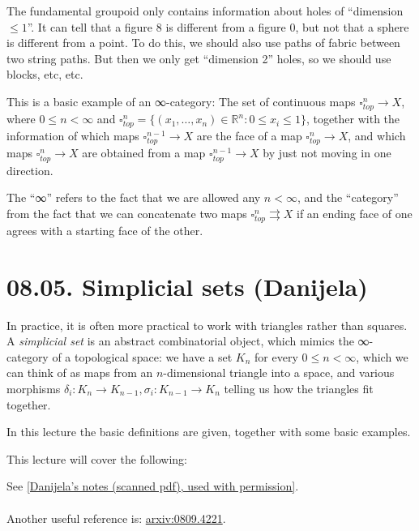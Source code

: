 \documentclass[a4paper]{amsart}
\numberwithin{figure}{section}
\theoremstyle{theorem}
\theoremstyle{definition}
\newcommand{\RR}{\mathbb{R}}
\begin{document}
The fundamental groupoid only contains information about holes of ``dimension  $\leq 1$''. It can tell that a figure 8 is different from a figure 0, but not that a sphere is different from a point. To do this, we should also use paths of fabric between two string paths. But then we only get ``dimension 2'' holes, so we should use blocks, etc, etc. 

This is a basic example of an ∞-category: The set of continuous maps $\square^n_{top} \to X$, where $0 \leq n < \infty$ and $\square^n_{top} = \{ (x_1, \dots, x_n) \in \RR^n : 0 \leq x_i \leq 1 \}$, together with the information of which maps $\square^{n-1}_{top} {\to} X$ are the face of a map $\square^n_{top} {\to} X$, and which maps $\square^n_{top} {\to} X$ are obtained from a map $\square^{n-1}_{top} {\to} X$ by just not moving in one direction.

The ``∞'' refers to the fact that we are allowed any $n < \infty$, and the ``category'' from the fact that we can concatenate two maps $\square^n_{top} {\rightrightarrows} X$ if an ending face of one agrees with a starting face of the other.




\section{08.05. Simplicial sets (Danijela)} \label{ss}

In practice, it is often more practical to work with triangles rather than squares. A \emph{simplicial set} is an abstract combinatorial object, which mimics the ∞-category of a topological space: we have a set $K_n$ for every $0 \leq n < \infty$, which we can think of as maps from an $n$-dimensional triangle into a space, and various morphisms $\delta_i: K_n \to K_{n-1}, \sigma_i: K_{n-1} \to K_n$ telling us how the triangles fit together.

In this lecture the basic definitions are given, together with some basic examples.

This lecture will cover the following: 

See \href{InfCat2SS.pdf}{[Danijela's notes (scanned pdf), used with permission]}. \\%
\\ 
Another useful reference is: \href{https://arxiv.org/abs/0809.4221}{arxiv:0809.4221}.
\end{document}
